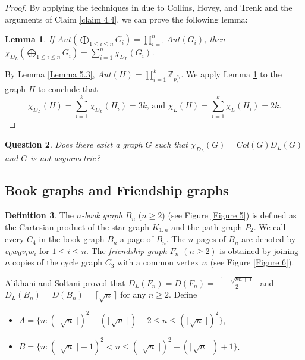 \documentclass[12pt,reqno,a4paper]{amsart}
\theoremstyle{definition}
\newtheorem{defn}{Definition}[section]
\newtheorem{lem}[defn]{Lemma}
\newtheorem{question}[defn]{Question}
\begin{document}
\begin{proof}
By applying the techniques in \cite[Corollary 5.5]{CHT2009} due to Collins, Hovey, and Trenk and the arguments of Claim \ref{claim 4.4}, we can prove the following lemma:

\begin{lem}\label{Lemma 5.4}
{\em If $Aut(\bigoplus_{1\leq i\leq n} G_{i}) = \prod_{i=1}^{n} Aut(G_{i})$, then $\chi_{D_{L}}(\bigoplus_{1\leq i\leq n} G_{i})=\sum_{i=1}^{n}\chi_{D_{L}}(G_{i})$. }
\end{lem}


By Lemma \ref{Lemma 5.3}, $Aut(H)=\prod_{i=1}^{k} \mathbb{Z}_{p_{i}^{n_{i}}}$. We apply Lemma \ref{Lemma 5.4} to the graph $H$ to conclude that
\[\chi_{D_{L}}(H)=\sum_{i=1}^{k} \chi_{D_{L}}(H_{i})=3k \text{, and } \chi_{L}(H)=\sum_{i=1}^{k} \chi_{L}(H_{i})=2k.\]
\end{proof}

\begin{question}
{\em Does there exist a graph $G$ 
such that $\chi_{D_{L}}(G)=Col(G)D_{L}(G)$ and $G$ is not asymmetric?} 
\end{question}


\subsection{Book graphs and Friendship graphs}

\begin{defn}\label{Definition 5.5}
The {\em $n$-book graph $B_{n}$} ($n \geq 2$) (see Figure \ref{Figure 5}) is defined as the Cartesian product of the star graph $K_{1,n}$ and the path graph $P_{2}$.
We call every $C_{4}$ in the book graph $B_{n}$ a page of $B_{n}$. The $n$ pages of $B_{n}$ are denoted by $v_{0}w_{0}v_{i}w_{i}$ for $1\leq i\leq n$. 
The {\em friendship
graph $F_{n}$}  $(n \geq 2)$ is obtained by joining $n$ copies of the cycle graph $C_{3}$ with a
common vertex $w$ (see Figure \ref{Figure 6}).
\end{defn}

Alikhani and Soltani \cite{AS, AS2017} proved that $D_{L}(F_{n})= D(F_{n})=\lceil\frac{1+\sqrt{8n+1}}{2}\rceil$ and $D_{L}(B_{n})= D(B_{n})=\lceil \sqrt{n}\,\rceil$ for any $n\geq 2$. 
Define
\begin{itemize}
    \item $A=\{n: (\lceil \sqrt{n}\,\rceil)^2-(\lceil \sqrt{n}\,\rceil) + 2 \leq n \leq (\lceil \sqrt{n}\,\rceil)^2\}$,
    \item $B= \{n: (\lceil \sqrt{n}\,\rceil-1)^2 < n \leq (\lceil \sqrt{n}\,\rceil)^2-(\lceil \sqrt{n}\,\rceil)+1\}$.
\end{itemize}
\end{document}
